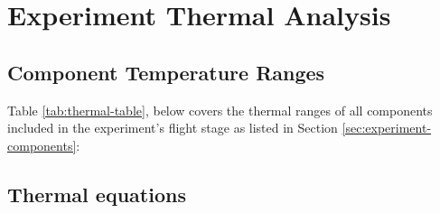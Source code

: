 \newpage
\section{Experiment Thermal Analysis} \label{sec:appI}
\subsection{Component Temperature Ranges}

Table {\ref{tab:thermal-table}}, below covers the thermal ranges of all components included in the experiment's flight stage as listed in Section \ref{sec:experiment-components}:



\raggedbottom

\subsection{Thermal equations}

